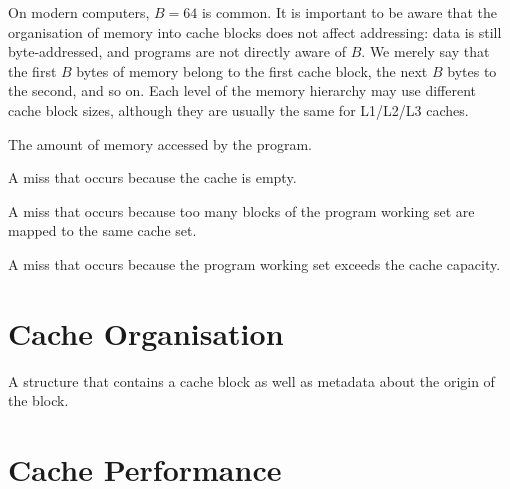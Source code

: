 On modern computers, $B=64$ is common.  It is important to be aware
that the organisation of memory into cache blocks does not affect
addressing: data is still byte-addressed, and programs are not
directly aware of $B$.  We merely say that the first $B$ bytes of
memory belong to the first cache block, the next $B$ bytes to the
second, and so on.  Each level of the memory hierarchy may use
different cache block sizes, although they are usually the same for
L1/L2/L3 caches.

\begin{definition}
  The amount of memory accessed by the program.
\end{definition}

\begin{definition}
  A miss that occurs because the cache is empty.
\end{definition}

\begin{definition}
  A miss that occurs because too many blocks of the program working
  set are mapped to the same cache set.
\end{definition}

\begin{definition}
  A miss that occurs because the program working set exceeds the cache
  capacity.
\end{definition}

\section{Cache Organisation}

\begin{definition}
  A structure that contains a cache block as well as metadata about
  the origin of the block.
\end{definition}

\section{Cache Performance}

